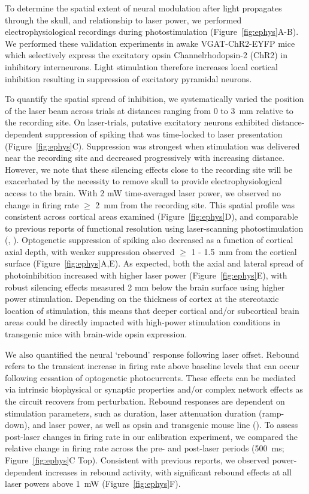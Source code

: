 \documentclass[9pt,lineno]{elife}
\begin{document}
To determine the spatial extent of neural modulation after light propagates through the skull, and relationship to laser power,  we performed electrophysiological recordings during photostimulation (Figure~\ref{fig:ephys}A-B).
We performed these validation experiments in awake VGAT-ChR2-EYFP mice which selectively express the excitatory opsin Channelrhodopsin-2 (ChR2) in inhibitory interneurons.
Light stimulation therefore increases local cortical inhibition resulting in suppression of excitatory pyramidal neurons.

To quantify the spatial spread of inhibition, we systematically varied the position of the laser beam across trials at distances ranging from 0 to 3~mm relative to the recording site.
On laser-trials, putative excitatory neurons exhibited distance-dependent suppression of spiking that was time-locked to laser presentation (Figure~\ref{fig:ephys}C).
Suppression was strongest when stimulation was delivered near the recording site and decreased progressively with increasing distance.
However, we note that these silencing effects close to the recording site will be exacerbated by the necessity to remove skull to provide electrophysiological access to the brain.
With 2 mW time-averaged laser power, we observed no change in firing rate $\ge$ 2~mm from the recording site.
This spatial profile was consistent across cortical areas examined (Figure~\ref{fig:ephys}D), and comparable to previous reports of functional resolution using laser-scanning photostimulation (\citealp{Li2019SpatiotemporalCircuits}, \citealp{Pinto2019Task-DependentRegions}).
Optogenetic suppression of spiking also decreased as a function of cortical axial depth, with weaker suppression observed $\ge$ 1 - 1.5~mm from the cortical surface (Figure~\ref{fig:ephys}A,E).
As expected, both the axial and lateral spread of photoinhibition increased with higher laser power (Figure~\ref{fig:ephys}E), with robust silencing effects measured 2 mm below the brain surface using higher power stimulation.
Depending on the thickness of cortex at the stereotaxic location of stimulation, this means that deeper cortical and/or subcortical brain areas could be directly impacted with high-power stimulation conditions in transgenic mice with brain-wide opsin expression.

We also quantified the neural `rebound' response following laser offset.
Rebound refers to the transient increase in firing rate above baseline levels that can occur following cessation of optogenetic photocurrents.
These effects can be mediated via intrinsic biophysical or synaptic properties and/or complex network effects as the circuit recovers from perturbation.
Rebound responses are dependent on stimulation parameters, such as duration, laser attenuation duration (ramp-down), and laser power, as well as opsin and transgenic mouse line (\citealp{Li2019SpatiotemporalCircuits}).
To assess post-laser changes in firing rate in our calibration experiment, we compared the relative change in firing rate across the pre- and post-laser periods (500~ms; Figure~\ref{fig:ephys}C Top).
Consistent with previous reports, we observed power-dependent increases in rebound activity, with significant rebound effects at all laser powers above 1~mW (Figure~\ref{fig:ephys}F).
\end{document}
